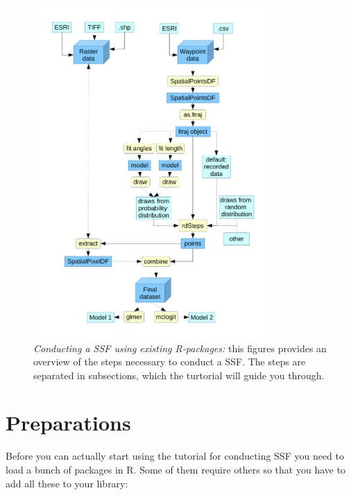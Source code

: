 \documentclass[11pt, a4paper]{article}\usepackage[]{graphicx}\usepackage[]{color}
\begin{document}
\begin{figure} %
\captionsetup{width=0.8\textwidth}
\centering
\includegraphics[width=0.8\textwidth]{Flowchart.pdf} %
\caption{\emph{Conducting a SSF using existing R-packages:} this figures provides an overview of the steps necessary to conduct a SSF. The steps are separated in subsections, which the turtorial will guide you through.}
\label{fig:Flowchart}
\end{figure}




\section{Preparations}
Before you can actually start using the tutorial for conducting SSF you need to load a bunch of packages in R. Some of them require others so that you have to add all these to your library:
\end{document}
